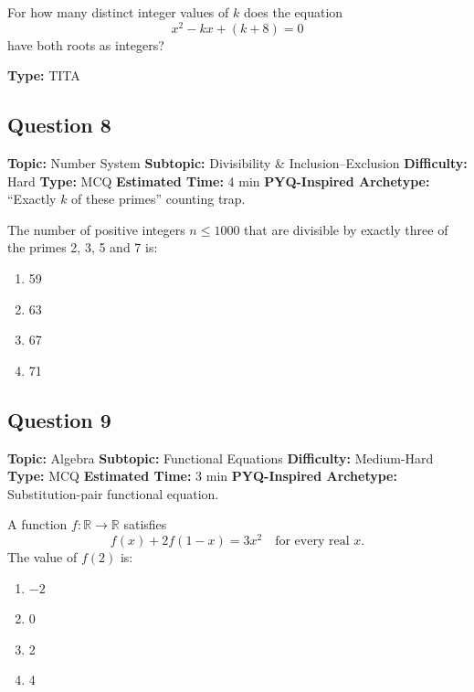 \documentclass[11pt]{article}
\begin{document}
\begin{tcolorbox}
For how many distinct integer values of \(k\) does the equation
\[
x^{2} - kx + (k+8) = 0
\]
have both roots as integers?
\end{tcolorbox}

\textbf{Type:} TITA

\subsection*{Question 8}
\textbf{Topic:} Number System \quad
\textbf{Subtopic:} Divisibility \& Inclusion–Exclusion \quad
\textbf{Difficulty:} Hard \quad
\textbf{Type:} MCQ \quad
\textbf{Estimated Time:} 4 min \quad
\textbf{PYQ-Inspired Archetype:} ``Exactly \(k\) of these primes'' counting trap.

\begin{tcolorbox}
The number of positive integers \(n \le 1000\) that are divisible by exactly three of the primes 2, 3, 5 and 7 is:
\end{tcolorbox}

\begin{enumerate}[label=(\Alph*)]
\item 59
\item 63
\item 67
\item 71
\end{enumerate}

\subsection*{Question 9}
\textbf{Topic:} Algebra \quad
\textbf{Subtopic:} Functional Equations \quad
\textbf{Difficulty:} Medium-Hard \quad
\textbf{Type:} MCQ \quad
\textbf{Estimated Time:} 3 min \quad
\textbf{PYQ-Inspired Archetype:} Substitution-pair functional equation.

\begin{tcolorbox}
A function \(f:\mathbb{R}\to\mathbb{R}\) satisfies
\[
f(x) + 2f(1-x) = 3x^{2} \quad \text{for every real } x.
\]
The value of \(f(2)\) is:
\end{tcolorbox}

\begin{enumerate}[label=(\Alph*)]
\item \(-2\)
\item 0
\item 2
\item 4
\end{enumerate}
\end{document}

